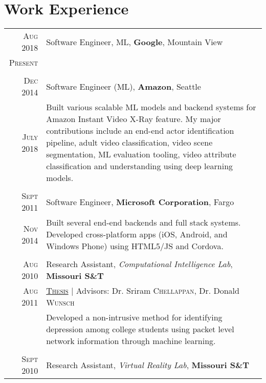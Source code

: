 \documentclass[a4paper,11pt]{article}
\begin{document}
\section{Work Experience}
\begin{longtable}{r|p{12.5cm}}
 \textsc{Aug 2018} & Software Engineer, ML, \normalsize \textbf{Google}, Mountain View \\
 \textsc{Present}
 \\
 \multicolumn{2}{c}{}
 \\
 \textsc{Dec 2014} & Software Engineer (ML), \normalsize \textbf{Amazon}, Seattle     \\
 \textsc{July 2018} & \footnotesize{\begin{minipage}[t]{12.5cm} Built various scalable ML models and backend systems for Amazon Instant Video X-Ray feature. My major contributions include an end-end actor identification pipeline, adult video classification, video scene segmentation, ML evaluation tooling, video attribute classification and understanding using deep learning models.
 \end{minipage}}
 \\
 \multicolumn{2}{c}{}
 \\
 \textsc{Sept 2011} & Software Engineer, \normalsize \textbf{Microsoft Corporation}, Fargo \\
 \textsc{Nov 2014} & \footnotesize{\begin{minipage}[t]{12.5cm} Built several end-end backends and full stack systems. Developed cross-platform apps (iOS, Android, and Windows Phone) using HTML5/JS and Cordova.
 \end{minipage}}
 \\
 \multicolumn{2}{c}{}
 \\
 \textsc{Aug 2010} & Research Assistant, \emph{Computational Intelligence Lab}, \normalsize \textbf{Missouri S\&T} \\
 \textsc{Aug 2011} & \textsc{\href{https://github.com/raghakot/papers/blob/master/thesis.pdf}{Thesis}} | \small Advisors: Dr. Sriram \textsc{Chellappan}, Dr. Donald \textsc{Wunsch} \\
 & \footnotesize{ \begin{minipage}[t]{12.5cm} Developed a non-intrusive method for identifying depression among college students using packet level network information through machine learning.
 \end{minipage}}
 \\
 \multicolumn{2}{c}{}
 \\
 \textsc{Sept 2010} & Research Assistant, \emph{Virtual Reality Lab}, \normalsize \textbf{Missouri S\&T} \\

\end{longtable}
\end{document}
